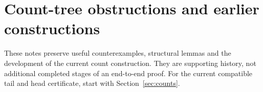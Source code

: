 \section{Count-tree obstructions and earlier constructions}\label{sec:count-history}

These notes preserve useful counterexamples, structural lemmas and the development of the current count construction. They are supporting history, not additional completed stages of an end-to-end proof. For the current compatible tail and head certificate, start with Section~\ref{sec:counts}.










